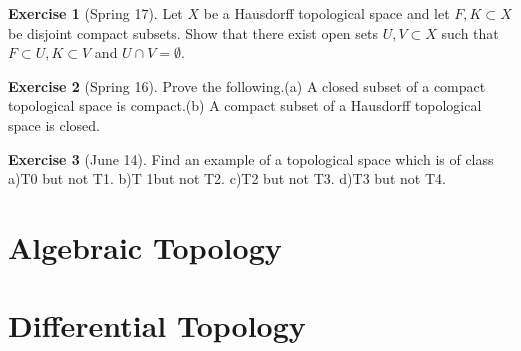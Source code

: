 \documentclass[12pt]{book}
\theoremstyle{definition}
\newtheorem{ex}{Exercise}
\begin{document}
	\begin{ex}[Spring 17]
		Let $X$ be a Hausdorff topological space and let $F,K\subset X$ be disjoint
		 compact subsets.  Show that there exist open sets $U,V\subset X$ such
		  that $F\subset U,K\subset V$ and $U\cap V=\emptyset$.
	\end{ex}

	\begin{ex}[Spring 16]
		Prove the following.(a)  A closed subset of a compact topological space is compact.(b)  A compact subset of a Hausdorff topological space is closed.
	\end{ex}

	\begin{ex}[June 14]
		Find an example of a topological space which is of class a)T0 but not T1. b)T 1but not T2. c)T2 but not T3. d)T3 but not T4.
	\end{ex}
	\chapter{Algebraic Topology}
	\chapter{Differential Topology}
\end{document}
